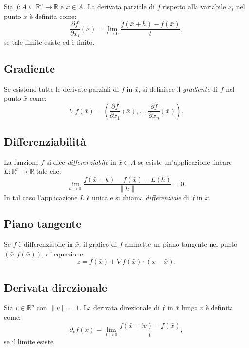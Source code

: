 \documentclass[a4paper,12pt,openright]{book}
\begin{document}
    Sia $f : A \subseteq \mathbb{R}^n \to \mathbb{R}$ e $\bar{x} \in A$.
    La derivata parziale di $f$ rispetto alla variabile $x_i$
    nel punto $\bar{x}$ è definita come:
    \[
    \frac{\partial f}{\partial x_i}(\bar{x})
    =
    \lim_{t \to 0}
    \frac{f(\bar{x} + h) - f(\bar{x})}{t},
    \]
    se tale limite esiste ed è finito.
    
    \subsection{Gradiente}
    
    Se esistono tutte le derivate parziali di $f$ in $\bar{x}$,
    si definisce il \emph{gradiente} di $f$ nel punto $\bar{x}$ come:
    \[
    \nabla f(\bar{x})
    =
    \left(
    \frac{\partial f}{\partial x_1}(\bar{x}),
    \dots,
    \frac{\partial f}{\partial x_n}(\bar{x})
    \right).
    \]
    
    \subsection{Differenziabilità}
    
    La funzione $f$ si dice \emph{differenziabile} in $\bar{x} \in A$
    se esiste un'applicazione lineare
    $L : \mathbb{R}^n \to \mathbb{R}$ tale che:
    \[
    \lim_{h \to 0}
    \frac{f(\bar{x} + h) - f(\bar{x}) - L(h)}{\|h\|} = 0.
    \]
    In tal caso l'applicazione $L$ è unica e si chiama
    \emph{differenziale} di $f$ in $\bar{x}$.
    
    \subsection{Piano tangente}
    
    Se $f$ è differenziabile in $\bar{x}$, il grafico di $f$
    ammette un piano tangente nel punto $(\bar{x}, f(\bar{x}))$,
    di equazione:
    \[
    z = f(\bar{x}) + \nabla f(\bar{x}) \cdot (x - \bar{x}).
    \]
    
    \subsection{Derivata direzionale}
    
    Sia $v \in \mathbb{R}^n$ con $\|v\| = 1$.
    La derivata direzionale di $f$ in $\bar{x}$ lungo $v$ è definita come:
    \[
    \partial_v f(\bar{x})
    =
    \lim_{t \to 0}
    \frac{f(\bar{x} + tv) - f(\bar{x})}{t},
    \]
    se il limite esiste.
    
\end{document}
